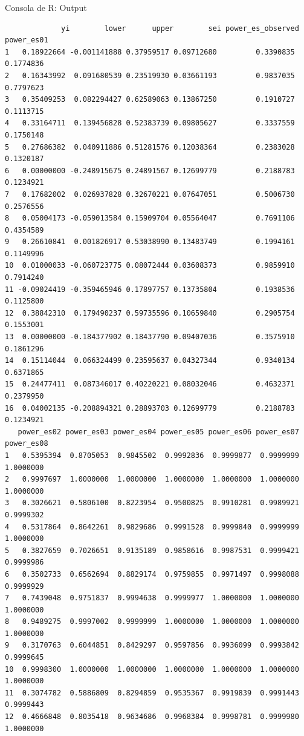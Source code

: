 \documentclass[
  bookmarksnumbered]{article}
\begin{document}
\begin{ROut}{Consola de R: Output~\thetcbcounter}
                \begin{footnotesize}
                \begin{verbatim}             yi        lower      upper        sei power_es_observed power_es01
1   0.18922664 -0.001141888 0.37959517 0.09712680         0.3390835  0.1774836
2   0.16343992  0.091680539 0.23519930 0.03661193         0.9837035  0.7797623
3   0.35409253  0.082294427 0.62589063 0.13867250         0.1910727  0.1113715
4   0.33164711  0.139456828 0.52383739 0.09805627         0.3337559  0.1750148
5   0.27686382  0.040911886 0.51281576 0.12038364         0.2383028  0.1320187
6   0.00000000 -0.248915675 0.24891567 0.12699779         0.2188783  0.1234921
7   0.17682002  0.026937828 0.32670221 0.07647051         0.5006730  0.2576556
8   0.05004173 -0.059013584 0.15909704 0.05564047         0.7691106  0.4354589
9   0.26610841  0.001826917 0.53038990 0.13483749         0.1994161  0.1149996
10  0.01000033 -0.060723775 0.08072444 0.03608373         0.9859910  0.7914240
11 -0.09024419 -0.359465946 0.17897757 0.13735804         0.1938536  0.1125800
12  0.38842310  0.179490237 0.59735596 0.10659840         0.2905754  0.1553001
13  0.00000000 -0.184377902 0.18437790 0.09407036         0.3575910  0.1861296
14  0.15114044  0.066324499 0.23595637 0.04327344         0.9340134  0.6371865
15  0.24477411  0.087346017 0.40220221 0.08032046         0.4632371  0.2379950
16  0.04002135 -0.208894321 0.28893703 0.12699779         0.2188783  0.1234921
   power_es02 power_es03 power_es04 power_es05 power_es06 power_es07 power_es08
1   0.5395394  0.8705053  0.9845502  0.9992836  0.9999877  0.9999999  1.0000000
2   0.9997697  1.0000000  1.0000000  1.0000000  1.0000000  1.0000000  1.0000000
3   0.3026621  0.5806100  0.8223954  0.9500825  0.9910281  0.9989921  0.9999302
4   0.5317864  0.8642261  0.9829686  0.9991528  0.9999840  0.9999999  1.0000000
5   0.3827659  0.7026651  0.9135189  0.9858616  0.9987531  0.9999421  0.9999986
6   0.3502733  0.6562694  0.8829174  0.9759855  0.9971497  0.9998088  0.9999929
7   0.7439048  0.9751837  0.9994638  0.9999977  1.0000000  1.0000000  1.0000000
8   0.9489275  0.9997002  0.9999999  1.0000000  1.0000000  1.0000000  1.0000000
9   0.3170763  0.6044851  0.8429297  0.9597856  0.9936099  0.9993842  0.9999645
10  0.9998300  1.0000000  1.0000000  1.0000000  1.0000000  1.0000000  1.0000000
11  0.3074782  0.5886809  0.8294859  0.9535367  0.9919839  0.9991443  0.9999443
12  0.4666848  0.8035418  0.9634686  0.9968384  0.9998781  0.9999980  1.0000000

\end{verbatim}
\end{footnotesize}
\end{ROut}
\end{document}
